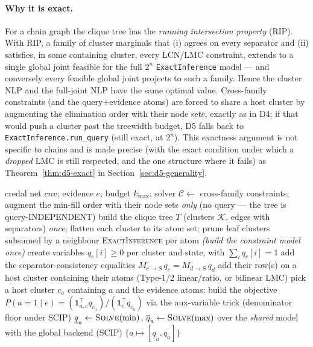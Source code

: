 \documentclass[11pt]{article}
\begin{document}
\paragraph{Why it is exact.} For a chain graph the clique tree has the \emph{running
intersection property} (RIP). With RIP, a family of cluster marginals that (i) agrees on every
separator and (ii) satisfies, in some containing cluster, every LCN/LMC constraint, extends to
a single global joint feasible for the full $2^n$ \texttt{ExactInference} model --- and
conversely every feasible global joint projects to such a family. Hence the cluster NLP and
the full-joint NLP have the same optimal value. Cross-family constraints (and the
query$+$evidence atoms) are forced to share a host cluster by augmenting the elimination order
with their node sets, exactly as in D4; if that would push a cluster past the treewidth
budget, D5 falls back to \texttt{ExactInference.run\_query} (still exact, at $2^n$). This
exactness argument is not specific to chains and is made precise (with the exact condition under
which a \emph{dropped} LMC is still respected, and the one structure where it fails) as
Theorem~\ref{thm:d5-exact} in Section~\ref{sec:d5-generality}.

\begin{algorithm}[t]
\caption{D5 junction-tree exact NLP (\texttt{CredalJT.run}; one tree, all marginals)}
\label{alg:d5}
\begin{algorithmic}[1]
\Require credal net $\mathit{cnv}$; evidence $e$; budget $k_{\max}$; solver
\State $\mathcal C\gets$ cross-family constraints; augment the min-fill order with their node
  sets \emph{only} (no query --- the tree is query-INDEPENDENT)
\State build the clique tree $T$ (clusters $\mathcal K$, edges with separators) \emph{once};
  flatten each cluster to its atom set; prune leaf clusters subsumed by a neighbour
 \Return \textsc{ExactInference} per atom
\EndIf
\State \emph{(build the constraint model once)} create variables $q_c[i]\ge 0$ per cluster and
  state, with $\sum_i q_c[i]=1$
  \State add the separator-consistency equalities $M_{c\to S}\,q_c = M_{d\to S}\,q_d$
\EndFor
{} add their row(s) on a host cluster containing their atoms
  (Type-1/2 linear/ratio, or bilinear LMC)
\EndFor
{} 
  \State pick a host cluster $c_a$ containing $a$ and the evidence atoms; build the objective
    $P(a{=}1\mid e)=(\mathbf 1_{a,e}^\top q_{c_a})/(\mathbf 1_{e}^\top q_{c_a})$ via the
    aux-variable trick (denominator floor under SCIP)
  \State $\underline q_a\gets\textsc{Solve}(\min)$, $\overline q_a\gets\textsc{Solve}(\max)$
    over the \emph{shared} model with the global backend (SCIP)
\EndFor
\State \Return $\{a \mapsto [\underline q_a,\overline q_a]\}$
\end{algorithmic}
\end{algorithm}
\end{document}
